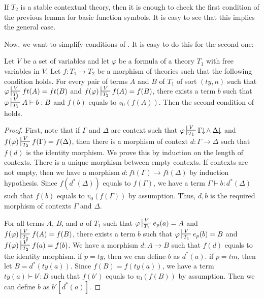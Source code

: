 \documentclass[reqno]{amsart}
\theoremstyle{definition}
\theoremstyle{remark}
\numberwithin{figure}{section}
\begin{document}
\begin{remark}
If $T_2$ is a stable contextual theory, then it is enough to check the first condition of the previous lemma for basic function symbols.
It is easy to see that this implies the general case.
\end{remark}

Now, we want to simplify conditions of .
It is easy to do this for the second one:

\begin{lem}
Let $V$ be a set of variables and let $\varphi$ be a formula of a theory $T_1$ with free variables in $V$.
Let $f : T_1 \to T_2$ be a morphism of theories such that the following condition holds.
For every pair of terms $A$ and $B$ of $T_1$ of sort $(ty,n)$ such that
$\varphi \sststile{T_1}{V} ft(A) = ft(B)$ and $f(\varphi) \sststile{T_2}{V} f(A) = f(B)$,
there exists a term $b$ such that $\varphi \sststile{T_1}{V} A \vdash b : B$ and $f(b)$ equals to $v_0(f(A))$.
Then the second condition of  holds.
\end{lem}
\begin{proof}
First, note that if $\Gamma$ and $\Delta$ are context such that $\varphi \sststile{T_1}{V} \Gamma\!\!\downarrow\!\land\:\Delta\!\!\downarrow$ and $f(\varphi) \sststile{T_2}{V} f(\Gamma) = f(\Delta)$,
then there is a morphism of context $d : \Gamma \to \Delta$ such that $f(d)$ is the identity morphism.
We prove this by induction on the length of contexts.
There is a unique morphism between empty contexts.
If contexts are not empty, then we have a morphism $d : ft(\Gamma) \to ft(\Delta)$ by induction hypothesis.
Since $f(d^*(\Delta))$ equals to $f(\Gamma)$, we have a term $\Gamma \vdash b : d^*(\Delta)$ such that $f(b)$ equals to $v_0(f(\Gamma))$ by assumption.
Thus, $d,b$ is the required morphism of contexts $\Gamma$ and $\Delta$.

For all terms $A$, $B$, and $a$ of $T_1$ such that $\varphi \sststile{T_1}{V} e_p(a) = A$ and $f(\varphi) \sststile{T_2}{V} f(A) = f(B)$,
there exists a term $b$ such that $\varphi \sststile{T_1}{V} e_p(b) = B$ and $f(\varphi) \sststile{T_2}{V} f(a) = f(b)$.
We have a morphism $d : A \to B$ such that $f(d)$ equals to the identity morphism.
if $p = ty$, then we can define $b$ as $d^*(a)$.
if $p = tm$, then let $B = d^*(ty(a))$.
Since $f(B) = f(ty(a))$, we have a term $ty(a) \vdash b' : B$ such that $f(b')$ equals to $v_0(f(B))$ by assumption.
Then we can define $b$ as $b'[d^*(a)]$.
\end{proof}
\end{document}
